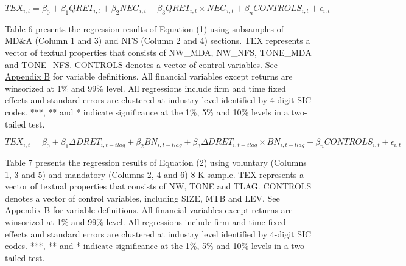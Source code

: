 \newpage

\setcounter{equation}{0}
\begin{equation}
TEX_{i,t}=\beta_0+\beta_1QRET_{i,t}+\beta_2NEG_{i,t}+\beta_3QRET_{i,t}\times NEG_{i,t}+\beta_nCONTROLS_{i,t}+\epsilon_{i,t}
\end{equation}

Table 6 presents the regression results of Equation (1) using subsamples of MD\&A (Column 1 and 3) and NFS (Column 2 and 4) sections. TEX represents a vector of textual properties that consists of NW\_MDA, NW\_NFS, TONE\_MDA and TONE\_NFS. CONTROLS denotes a vector of control variables. See \hyperref[appb]{Appendix B} for variable definitions. All financial variables except returns are winsorized at 1\% and 99\% level. All regressions include firm and time fixed effects and standard errors are clustered at industry level identified by 4-digit SIC codes. ***, ** and * indicate significance at the 1\%, 5\% and 10\% levels in a two-tailed test.

\newpage

\setcounter{equation}{1}
\begin{equation}
	TEX_{i,t}=\beta_0+\beta_1\Delta DRET_{i,t-tlag}+\beta_2BN_{i,t-tlag}+\beta_3\Delta DRET_{i,t-tlag}\times BN_{i,t-tlag}+\beta_nCONTROLS_{i,t}+\epsilon_{i,t}
\end{equation}
\newline

Table 7 presents the regression results of Equation (2) using voluntary (Columns 1, 3 and 5) and mandatory (Columns 2, 4 and 6) 8-K sample. TEX represents a vector of textual properties that consists of NW, TONE and TLAG. CONTROLS denotes a vector of control variables, including SIZE, MTB and LEV. See \hyperref[appb]{Appendix B} for variable definitions. All financial variables except returns are winsorized at 1\% and 99\% level. All regressions include firm and time fixed effects and standard errors are clustered at industry level identified by 4-digit SIC codes. ***, ** and * indicate significance at the 1\%, 5\% and 10\% levels in a two-tailed test.

